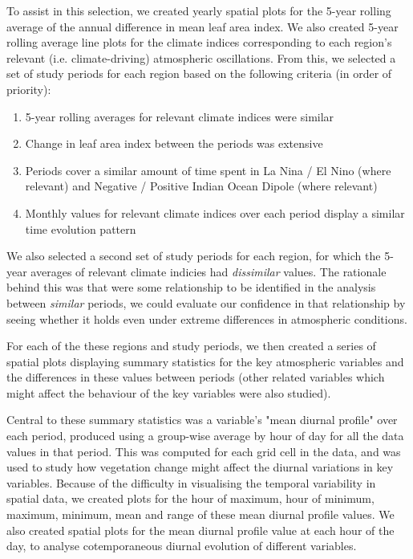 To assist in this selection, we created yearly spatial plots for the 5-year rolling average of the annual difference in mean leaf area index. We also created 5-year rolling average line plots for the climate indices corresponding to each region's relevant (i.e. climate-driving) atmospheric oscillations. From this, we selected a set of study periods for each region based on the following criteria (in order of priority):
\begin{enumerate}
	\item 5-year rolling averages for relevant climate indices were similar
	\item Change in leaf area index between the periods was extensive
	\item Periods cover a similar amount of time spent in La Nina / El Nino (where relevant) and Negative / Positive Indian Ocean Dipole (where relevant)
	\item Monthly values for relevant climate indices over each period display a similar time evolution pattern
\end{enumerate}

We also selected a second set of study periods for each region, for which the 5-year averages of relevant climate indicies had \textit{dissimilar} values. The rationale behind this was that were some relationship to be identified in the analysis between \textit{similar} periods, we could evaluate our confidence in that relationship by seeing whether it holds even under extreme differences in atmospheric conditions.

For each of the these regions and study periods, we then created a series of spatial plots displaying summary statistics for the key atmospheric variables and the differences in these values between periods (other related variables which might affect the behaviour of the key variables were also studied).

Central to these summary statistics was a variable's "mean diurnal profile" over each period, produced using a group-wise average by hour of day for all the data values in that period. This was computed for each grid cell in the data, and was used to study how vegetation change might affect the diurnal variations in key variables. Because of the difficulty in visualising the temporal variability in spatial data, we created plots for the hour of maximum, hour of minimum, maximum, minimum, mean and range of these mean diurnal profile values. We also created spatial plots for the mean diurnal profile value at each hour of the day, to analyse cotemporaneous diurnal evolution of different variables.

